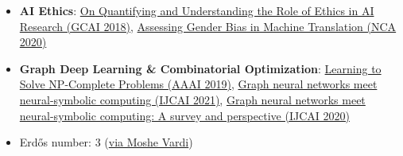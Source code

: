 
{

  \small
  \begin{itemize}
    \item \textbf{AI Ethics}: {\small {\href{http://www.easychair.org/publications/paper/Z7D4}{On Quantifying and Understanding the Role of Ethics in AI Research (GCAI 2018)}}}, {\small {\href{http://arxiv.org/abs/1809.02208}{Assessing Gender Bias in Machine Translation (NCA 2020)}}}
    \item \textbf{Graph Deep Learning \& Combinatorial Optimization}: {\small {\href{http://www.arxiv.org/abs/1809.02721}{Learning to Solve NP-Complete Problems (AAAI 2019)}}}, {\small {\href{https://arxiv.org/pdf/1903.04598.pdf}{Graph neural networks meet neural-symbolic computing (IJCAI 2021)}}}, {\small {\href{https://www.ijcai.org/proceedings/2020/0679.pdf}{Graph neural networks meet neural-symbolic computing: A survey and perspective (IJCAI 2020)}}}
    \item Erdős number: 3 (\href{https://mathscinet.ams.org/mathscinet/freetools/collab-dist?source=177205&target=189017}{via Moshe Vardi})
  \end{itemize}
}